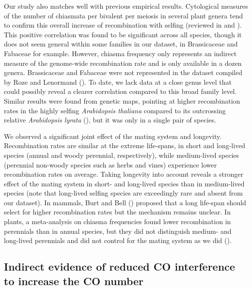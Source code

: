 \documentclass{article}
\begin{document}
Our study also matches well with previous empirical results. Cytological measures of the number of chiasmata per bivalent per meiosis in several plant genera tend to confirm this overall increase of recombination with selfing (reviewed in \cite{rozeSelfFertilizationEvolutionRecombination2005} and \cite{ross-ibarraGenomeSizeRecombination2007a}). This positive correlation was found to be significant across all species, though it does not seem general within some families in our dataset, in Brassicaceae and Fabaceae for example. However, chiasma frequency only represents an indirect measure of the genome-wide recombination rate and is only available in a dozen genera. Brassicaceae and Fabaceae were not represented in the dataset compiled by Roze and Lenormand (\citeyear{rozeSelfFertilizationEvolutionRecombination2005}). To date, we lack data at a close genus level that could possibly reveal a clearer correlation compared to this broad family level. Similar results were found from genetic maps, pointing at higher recombination rates in the highly selfing \textit{Arabidopsis thaliana} compared to its outcrossing relative \textit{Arabidopsis lyrata} (\cite{hanssonComparativeGeneMapping2006a,kawabeComparativeGeneMapping2006,kuittinenComparingLinkageMaps2004}), but it was only in a single pair of species.


We observed a significant joint effect of the mating system and longevity. Recombination rates are similar at the extreme life-spans, in short and long-lived species (annual and woody perennial, respectively), while medium-lived species (perennial non-woody species such as herbs and vines) experience lower recombination rates on average. Taking longevity into account reveals a stronger effect of the mating system in short- and long-lived species than in medium-lived species (note that long-lived selfing species are exceedingly rare and absent from our dataset). In mammals, Burt and Bell (\cite{burtMammalianChiasmaFrequencies1987}) proposed that a long life-span should select for higher recombination rates but the mechanism remains unclear. In plants, a meta-analysis on chiasma frequencies found lower recombination in perennials than in annual species, but they did not distinguish medium- and long-lived perennials and did not control for the mating system as we did (\cite{koellaEcologicalCorrelatesChiasma1993}).


\subsection*{Indirect evidence of reduced CO interference to increase the CO number}
\end{document}
